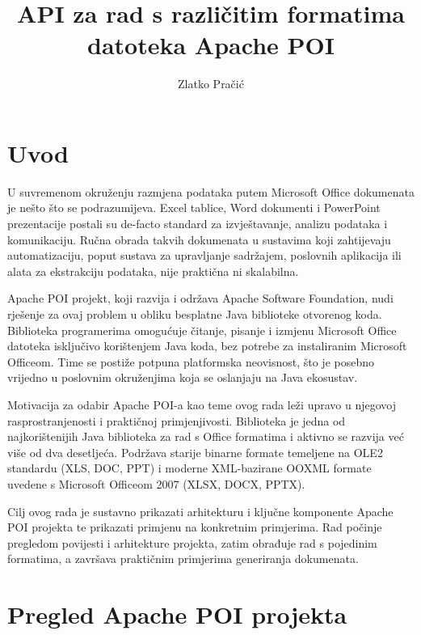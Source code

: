 \documentclass[]{foi}
\title{API za rad s različitim formatima datoteka Apache POI}
\author{Zlatko Pračić}
\begin{document}
\renewcommand{\lstlistlistingname}{Popis isječaka koda}
\renewcommand{\lstlistingname}{Isječak koda}

\maketitle

\tableofcontents

\makeatletter {} \makeatother
\pagestyle{plain}

\chapter{Uvod}

U suvremenom okruženju razmjena podataka putem Microsoft Office dokumenata je nešto što se podrazumijeva. Excel tablice, Word dokumenti i PowerPoint prezentacije postali su de-facto standard za izvještavanje, analizu podataka i komunikaciju. Ručna obrada takvih dokumenata u sustavima koji zahtijevaju automatizaciju, poput sustava za upravljanje sadržajem, poslovnih aplikacija ili alata za ekstrakciju podataka, nije praktična ni skalabilna.

Apache POI projekt, koji razvija i održava Apache Software Foundation, nudi rješenje za ovaj problem u obliku besplatne Java biblioteke otvorenog koda. Biblioteka programerima omogućuje čitanje, pisanje i izmjenu Microsoft Office datoteka isključivo korištenjem Java koda, bez potrebe za instaliranim Microsoft Officeom. Time se postiže potpuna platformska neovisnost, što je posebno vrijedno u poslovnim okruženjima koja se oslanjaju na Java ekosustav.
 
Motivacija za odabir Apache POI-a kao teme ovog rada leži upravo u njegovoj rasprostranjenosti i praktičnoj primjenjivosti. Biblioteka je jedna od najkorištenijih Java biblioteka za rad s Office formatima i aktivno se razvija već više od dva desetljeća. Podržava starije binarne formate temeljene na OLE2 standardu (XLS, DOC, PPT) i moderne XML-bazirane OOXML formate uvedene s Microsoft Officeom 2007 (XLSX, DOCX, PPTX).

Cilj ovog rada je sustavno prikazati arhitekturu i ključne komponente Apache POI projekta te prikazati primjenu na konkretnim primjerima. Rad počinje pregledom povijesti i arhitekture projekta, zatim obrađuje rad s pojedinim formatima, a završava praktičnim primjerima generiranja dokumenata.

\chapter{Pregled Apache POI projekta}
\end{document}
